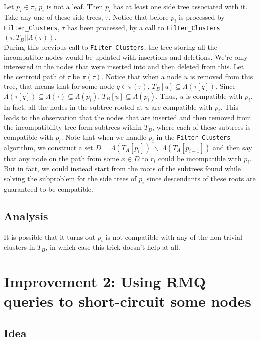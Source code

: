 \documentclass[a4paper]{article}
\begin{document}
    Let $p_i \in \pi$, $p_i$ is not a leaf. Then $p_i$ has at least one side tree associated with it. Take any one of these side trees, $\tau$. Notice that before $p_i$ is processed by \texttt{Filter\_Clusters}, $\tau$ has been processed, by a call to \texttt{Filter\_Clusters}$(\tau, T_B||\Lambda(\tau))$.\\

    During this previous call to \texttt{Filter\_Clusters}, the tree storing all the incompatible nodes would be updated with insertions and deletions. We're only interested in the nodes that were inserted into and then deleted from this. Let the centroid path of $\tau$ be $\pi(\tau)$. Notice that when a node $u$ is removed from this tree, that means that for some node $q \in \pi(\tau)$, $T_B[u] \subseteq \Lambda(\tau[q])$. Since $\Lambda(\tau[q]) \subseteq \Lambda(\tau) \subseteq \Lambda(p_i)$, $T_B[u] \subseteq \Lambda(p_i)$. Thus, $u$ is compatible with $p_i$. In fact, all the nodes in the subtree rooted at $u$ are compatible with $p_i$. This leads to the observation that the nodes that are inserted and then removed from the incompatibility tree form subtrees within $T_B$, where each of these subtrees is compatible with $p_i$. Note that when we handle $p_i$ in the \texttt{Filter\_Clusters} algorithm, we construct a set $D = \Lambda(T_A[p_i]) \;\backslash\; \Lambda(T_A[p_{i-1}])$ and then say that any node on the path from some $x \in D$ to $r_i$ could be incompatible with $p_i$. But in fact, we could instead start from the roots of the subtrees found while solving the subproblem for the side trees of $p_i$ since descendants of these roots are guaranteed to be compatible.\\

    \subsection{Analysis}

    It is possible that it turns out $p_i$ is not compatible with any of the non-trivial clusters in $T_B$, in which case this trick doesn't help at all.

    \section{Improvement 2: Using RMQ queries to short-circuit some nodes}

    \subsection{Idea}
\end{document}

